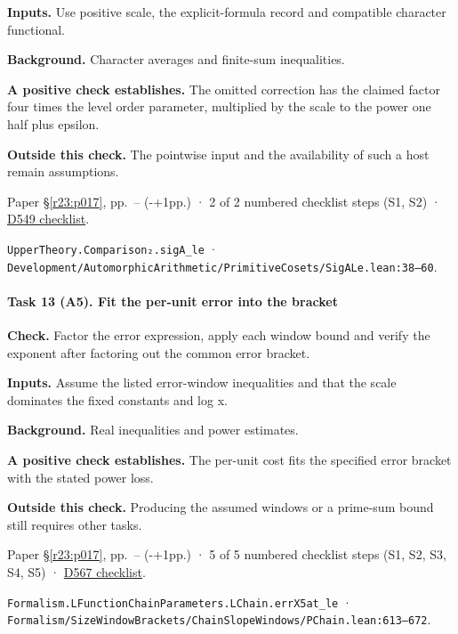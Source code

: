 \textbf{Inputs.} Use positive scale, the explicit-formula record and compatible character functional.

\textbf{Background.} Character averages and finite-sum inequalities.

\textbf{A positive check establishes.} The omitted correction has the claimed factor four times the level order parameter, multiplied by the scale to the power one half plus epsilon.

\textbf{Outside this check.} The pointwise input and the availability of such a host remain assumptions.

Paper \S\ref{r23:p017}, pp.\ \pageref{v5:d548-end}--\pageref{v5:chars-end} (\number\numexpr{}-+1\relax pp.) · 2 of 2 numbered checklist steps (S1, S2) · \href{https://github.com/GunheeC/rh-lean-verification-atlas/blob/v0.1.0/units/D549.check.md}{D549 checklist}.

\nolinkurl{UpperTheory.Comparison₂.sigA_le} · \nolinkurl{Development/AutomorphicArithmetic/PrimitiveCosets/SigALe.lean:38–60}.

\paragraph{Task 13 (A5). Fit the per-unit error into the bracket}\label{v7:task-13}

\textbf{Check.} Factor the error expression, apply each window bound and verify the exponent after factoring out the common error bracket.

\textbf{Inputs.} Assume the listed error-window inequalities and that the scale dominates the fixed constants and log x.

\textbf{Background.} Real inequalities and power estimates.

\textbf{A positive check establishes.} The per-unit cost fits the specified error bracket with the stated power loss.

\textbf{Outside this check.} Producing the assumed windows or a prime-sum bound still requires other tasks.

Paper \S\ref{r23:p017}, pp.\ \pageref{r24:d567}--\pageref{v5:d567-end} (\number\numexpr{}-+1\relax pp.) · 5 of 5 numbered checklist steps (S1, S2, S3, S4, S5) · \href{https://github.com/GunheeC/rh-lean-verification-atlas/blob/v0.1.0/units/D567.check.md}{D567 checklist}.

\nolinkurl{Formalism.LFunctionChainParameters.LChain.errX5at_le} · \nolinkurl{Formalism/SizeWindowBrackets/ChainSlopeWindows/PChain.lean:613–672}.

